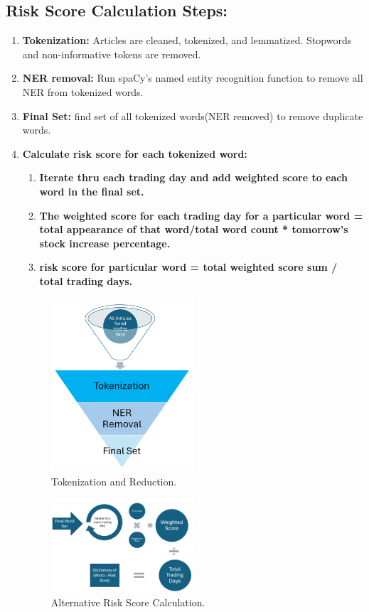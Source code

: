 \documentclass[twocolumn]{article}
\begin{document}
\subsection{Risk Score Calculation Steps:}
\begin{enumerate}
    \item \textbf{Tokenization:} Articles are cleaned, tokenized, and lemmatized. Stopwords and non-informative tokens are removed.
    \item \textbf{NER removal:} Run spaCy's named entity recognition function to remove all NER from tokenized words.
    \item \textbf{Final Set:} find set of all tokenized words(NER removed) to remove duplicate words.
    \item \textbf{Calculate risk score for each tokenized word:} 
    \begin{enumerate}
    \item \textbf{Iterate thru each trading day and add weighted score to each word in the final set.}
    \item \textbf{The weighted score for each trading day for a particular word = total appearance of that word/total word count * tomorrow's stock increase percentage.}
    \item \textbf{risk score for particular word = total weighted score sum / total trading days.}
    \end{enumerate}
    \begin{figure}[ht]
        \centering
        \includegraphics[width=0.5\textwidth]{Token_word_set.png}
        \caption{Tokenization and Reduction.}
        \label{fig:tonkenization}
    \end{figure}
    \begin{figure}[ht]
        \centering
        \includegraphics[width=0.5\textwidth]{Risk Score Calculation.png}
        \caption{Alternative Risk Score Calculation.}
        \label{fig:risk score calculation}
    \end{figure}        
\end{enumerate}
\end{document}
